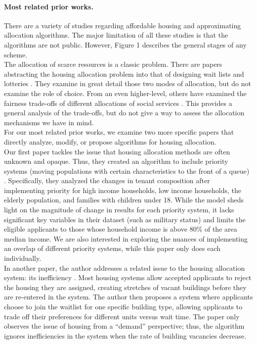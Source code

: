 \documentclass[11pt]{article}
\begin{document}
\paragraph{Most related prior works.}
There are a variety of studies regarding affordable housing and approximating allocation algorithms. The major limitation of all these studies is that the algorithms are not public. However, Figure 1 describes the general stages of any scheme.\\
\newline
The allocation of scarce resources is a classic problem. There are papers abstracting the housing allocation problem into that of designing wait lists and lotteries \cite{arnosti2020design}. They examine in great detail those two modes of allocation, but do not examine the role of choice. From an even higher-level, others have examined the fairness trade-offs of different allocations of social services \cite{mashiat2022trade}. This provides a general analysis of the trade-offs, but do not give a way to assess the allocation mechanisms we have in mind.  \\
\newline
For our most related prior works, we examine two more specific papers that directly analyze, modify, or propose algorithms for housing allocation. \\
\newline
Our first paper tackles the issue that housing allocation methods are often unknown and opaque. Thus, they created an algorithm to include priority systems (moving populations with certain characteristics to the front of a queue) \cite{nyuaffordablehousing}. Specifically, they analyzed the changes in tenant composition after implementing priority for high income households, low income households, the elderly population, and families with children under 18. While the model sheds light on the magnitude of change in results for each priority system, it lacks significant key variables in their dataset (such as military status) and limits the eligible applicants to those whose household income is above 80\% of the area median income. We are also interested in exploring the nuances of implementing an overlap of different priority systems, while this paper only does each individually.\\
\newline
In another paper, the author addresses a related issue to the housing allocation system: its inefficiency \cite{harvardpublichousing}. Most housing systems allow accepted applicants to reject the housing they are assigned, creating stretches of vacant buildings before they are re-entered in the system. The author then proposes a system where applicants choose to join the waitlist for one specific building type, allowing applicants to trade off their preferences for different units versus wait time. The paper only observes the issue of housing from a “demand” perspective; thus, the algorithm ignores inefficiencies in the system when the rate of building vacancies decrease.
\end{document}

